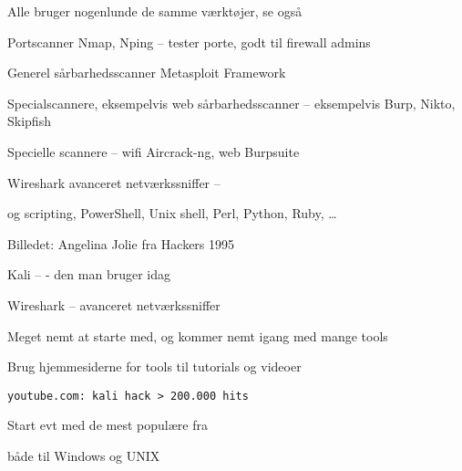 \documentclass[20pt,landscape,a4paper,footrule]{foils}
\begin{document}
\begin{list2}
\item Alle bruger nogenlunde de samme værktøjer, se også 
\item Portscanner Nmap, Nping -- tester porte, godt til firewall admins 
\item Generel sårbarhedsscanner Metasploit Framework 
\item Specialscannere, eksempelvis web sårbarhedsscanner -- eksempelvis Burp, Nikto, Skipfish
\item Specielle scannere -- wifi Aircrack-ng, web Burpsuite 
\item Wireshark avanceret netværkssniffer -- 
\item og scripting, PowerShell, Unix shell, Perl, Python, Ruby, \ldots
\end{list2}

Billedet: Angelina Jolie fra Hackers 1995





\begin{list1}
\item Kali --  - den man bruger idag
\item Wireshark --  avanceret netværkssniffer
\item Meget nemt at starte med, og kommer nemt igang med mange tools
\item Brug hjemmesiderne for tools til tutorials og videoer
\item \verb+youtube.com: kali hack > 200.000 hits+
\item Start evt med de mest populære fra 
\end{list1}








\centerline{}
\vskip 5mm
\centerline{både til Windows og UNIX}
\end{document}
